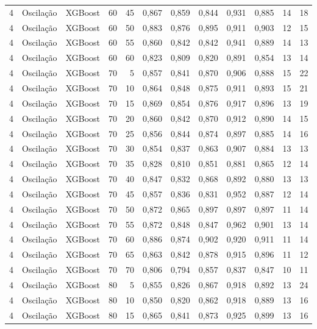 \begin{longtable}{@{}rllrrrrrrrrr@{}}
4 & Oscilação & XGBoost & 60 & 45 & 0,867 & 0,859 & 0,844 & 0,931 & 0,885 & 14 & 18 \\
4 & Oscilação & XGBoost & 60 & 50 & 0,883 & 0,876 & 0,895 & 0,911 & 0,903 & 12 & 15 \\
4 & Oscilação & XGBoost & 60 & 55 & 0,860 & 0,842 & 0,842 & 0,941 & 0,889 & 14 & 13 \\
4 & Oscilação & XGBoost & 60 & 60 & 0,823 & 0,809 & 0,820 & 0,891 & 0,854 & 13 & 14 \\
4 & Oscilação & XGBoost & 70 & 5 & 0,857 & 0,841 & 0,870 & 0,906 & 0,888 & 15 & 22 \\
4 & Oscilação & XGBoost & 70 & 10 & 0,864 & 0,848 & 0,875 & 0,911 & 0,893 & 15 & 21 \\
4 & Oscilação & XGBoost & 70 & 15 & 0,869 & 0,854 & 0,876 & 0,917 & 0,896 & 13 & 19 \\
4 & Oscilação & XGBoost & 70 & 20 & 0,860 & 0,842 & 0,870 & 0,912 & 0,890 & 14 & 15 \\
4 & Oscilação & XGBoost & 70 & 25 & 0,856 & 0,844 & 0,874 & 0,897 & 0,885 & 14 & 16 \\
4 & Oscilação & XGBoost & 70 & 30 & 0,854 & 0,837 & 0,863 & 0,907 & 0,884 & 13 & 13 \\
4 & Oscilação & XGBoost & 70 & 35 & 0,828 & 0,810 & 0,851 & 0,881 & 0,865 & 12 & 14 \\
4 & Oscilação & XGBoost & 70 & 40 & 0,847 & 0,832 & 0,868 & 0,892 & 0,880 & 13 & 13 \\
4 & Oscilação & XGBoost & 70 & 45 & 0,857 & 0,836 & 0,831 & 0,952 & 0,887 & 12 & 14 \\
4 & Oscilação & XGBoost & 70 & 50 & 0,872 & 0,865 & 0,897 & 0,897 & 0,897 & 11 & 14 \\
4 & Oscilação & XGBoost & 70 & 55 & 0,872 & 0,848 & 0,847 & 0,962 & 0,901 & 13 & 14 \\
4 & Oscilação & XGBoost & 70 & 60 & 0,886 & 0,874 & 0,902 & 0,920 & 0,911 & 11 & 14 \\
4 & Oscilação & XGBoost & 70 & 65 & 0,863 & 0,842 & 0,878 & 0,915 & 0,896 & 11 & 12 \\
4 & Oscilação & XGBoost & 70 & 70 & 0,806 & 0,794 & 0,857 & 0,837 & 0,847 & 10 & 11 \\
4 & Oscilação & XGBoost & 80 & 5 & 0,855 & 0,826 & 0,867 & 0,918 & 0,892 & 13 & 24 \\
4 & Oscilação & XGBoost & 80 & 10 & 0,850 & 0,820 & 0,862 & 0,918 & 0,889 & 13 & 16 \\
4 & Oscilação & XGBoost & 80 & 15 & 0,865 & 0,841 & 0,873 & 0,925 & 0,899 & 13 & 16 \\

\end{longtable}
